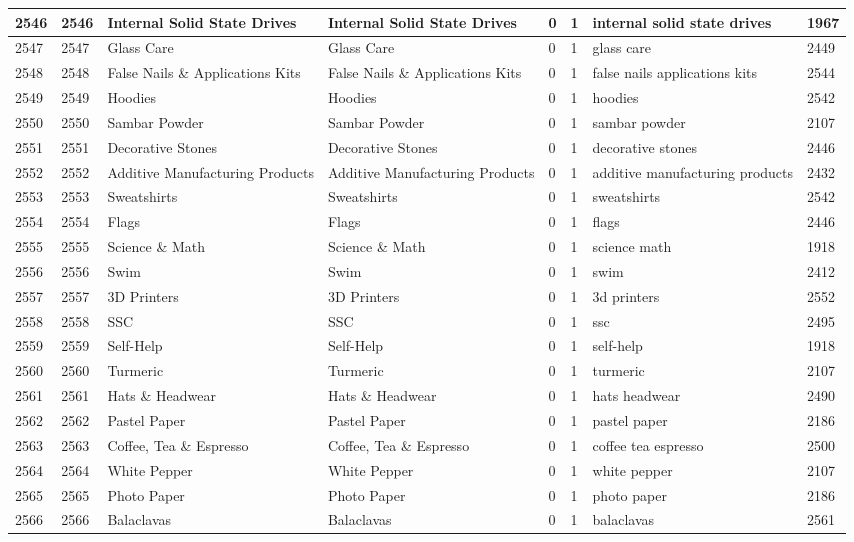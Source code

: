 \begin{longtable}{|l|l|l|l|l|l|l|l|}
2546 & 2546 & Internal Solid State Drives & Internal Solid State Drives & 0 & 1 & internal solid state drives & 1967 \\ \hline 
2547 & 2547 & Glass Care & Glass Care & 0 & 1 & glass care & 2449 \\ \hline 
2548 & 2548 & False Nails \& Applications Kits & False Nails \& Applications Kits & 0 & 1 & false nails applications kits & 2544 \\ \hline 
2549 & 2549 & Hoodies & Hoodies & 0 & 1 & hoodies & 2542 \\ \hline 
2550 & 2550 & Sambar Powder & Sambar Powder & 0 & 1 & sambar powder & 2107 \\ \hline 
2551 & 2551 & Decorative Stones & Decorative Stones & 0 & 1 & decorative stones & 2446 \\ \hline 
2552 & 2552 & Additive Manufacturing Products & Additive Manufacturing Products & 0 & 1 & additive manufacturing products & 2432 \\ \hline 
2553 & 2553 & Sweatshirts & Sweatshirts & 0 & 1 & sweatshirts & 2542 \\ \hline 
2554 & 2554 & Flags & Flags & 0 & 1 & flags & 2446 \\ \hline 
2555 & 2555 & Science \& Math & Science \& Math & 0 & 1 & science math & 1918 \\ \hline 
2556 & 2556 & Swim & Swim & 0 & 1 & swim & 2412 \\ \hline 
2557 & 2557 & 3D Printers & 3D Printers & 0 & 1 & 3d printers & 2552 \\ \hline 
2558 & 2558 & SSC & SSC & 0 & 1 & ssc & 2495 \\ \hline 
2559 & 2559 & Self-Help & Self-Help & 0 & 1 & self-help & 1918 \\ \hline 
2560 & 2560 & Turmeric & Turmeric & 0 & 1 & turmeric & 2107 \\ \hline 
2561 & 2561 & Hats \& Headwear & Hats \& Headwear & 0 & 1 & hats headwear & 2490 \\ \hline 
2562 & 2562 & Pastel Paper & Pastel Paper & 0 & 1 & pastel paper & 2186 \\ \hline 
2563 & 2563 & Coffee, Tea \& Espresso & Coffee, Tea \& Espresso & 0 & 1 & coffee tea espresso & 2500 \\ \hline 
2564 & 2564 & White Pepper & White Pepper & 0 & 1 & white pepper & 2107 \\ \hline 
2565 & 2565 & Photo Paper & Photo Paper & 0 & 1 & photo paper & 2186 \\ \hline 
2566 & 2566 & Balaclavas & Balaclavas & 0 & 1 & balaclavas & 2561 \\ \hline 

\end{longtable}
